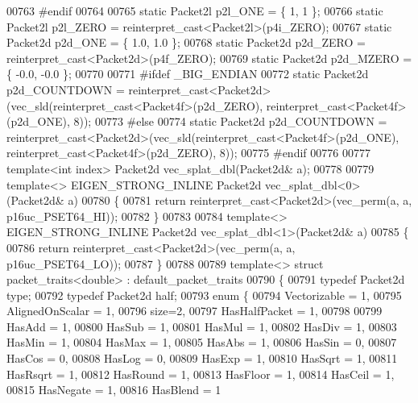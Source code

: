 \begin{DoxyCode}
{00763 \textcolor{preprocessor}{#endif}
00764 
00765 \textcolor{keyword}{static} Packet2l  p2l\_ONE  = \{ 1, 1 \};
00766 \textcolor{keyword}{static} Packet2l  p2l\_ZERO = \textcolor{keyword}{reinterpret\_cast<}Packet2l\textcolor{keyword}{>}(p4i\_ZERO);
00767 \textcolor{keyword}{static} Packet2d  p2d\_ONE  = \{ 1.0, 1.0 \}; 
00768 \textcolor{keyword}{static} Packet2d  p2d\_ZERO = \textcolor{keyword}{reinterpret\_cast<}Packet2d\textcolor{keyword}{>}(p4f\_ZERO);
00769 \textcolor{keyword}{static} Packet2d  p2d\_MZERO = \{ -0.0, -0.0 \};
00770 
00771 \textcolor{preprocessor}{#ifdef \_BIG\_ENDIAN}
00772 \textcolor{keyword}{static} Packet2d p2d\_COUNTDOWN = \textcolor{keyword}{reinterpret\_cast<}Packet2d\textcolor{keyword}{>}(vec\_sld(reinterpret\_cast<Packet4f>(p2d\_ZERO), 
      reinterpret\_cast<Packet4f>(p2d\_ONE), 8));
00773 \textcolor{preprocessor}{#else}
00774 \textcolor{keyword}{static} Packet2d p2d\_COUNTDOWN = \textcolor{keyword}{reinterpret\_cast<}Packet2d\textcolor{keyword}{>}(vec\_sld(reinterpret\_cast<Packet4f>(p2d\_ONE), 
      reinterpret\_cast<Packet4f>(p2d\_ZERO), 8));
00775 \textcolor{preprocessor}{#endif}
00776 
00777 \textcolor{keyword}{template}<\textcolor{keywordtype}{int} index> Packet2d vec\_splat\_dbl(Packet2d& a);
00778 
00779 \textcolor{keyword}{template}<> EIGEN\_STRONG\_INLINE Packet2d vec\_splat\_dbl<0>(Packet2d& a)
00780 \{
00781   \textcolor{keywordflow}{return} \textcolor{keyword}{reinterpret\_cast<}Packet2d\textcolor{keyword}{>}(vec\_perm(a, a, p16uc\_PSET64\_HI));
00782 \}
00783 
00784 \textcolor{keyword}{template}<> EIGEN\_STRONG\_INLINE Packet2d vec\_splat\_dbl<1>(Packet2d& a)
00785 \{
00786   \textcolor{keywordflow}{return} \textcolor{keyword}{reinterpret\_cast<}Packet2d\textcolor{keyword}{>}(vec\_perm(a, a, p16uc\_PSET64\_LO));
00787 \}
00788 
00789 \textcolor{keyword}{template}<> \textcolor{keyword}{struct }packet\_traits<double> : default\_packet\_traits
00790 \{
00791   \textcolor{keyword}{typedef} Packet2d type;
00792   \textcolor{keyword}{typedef} Packet2d half;
00793   \textcolor{keyword}{enum} \{
00794     Vectorizable = 1,
00795     AlignedOnScalar = 1,
00796     size=2,
00797     HasHalfPacket = 1,
00798 
00799     HasAdd  = 1,
00800     HasSub  = 1,
00801     HasMul  = 1,
00802     HasDiv  = 1,
00803     HasMin  = 1,
00804     HasMax  = 1,
00805     HasAbs  = 1,
00806     HasSin  = 0,
00807     HasCos  = 0,
00808     HasLog  = 0,
00809     HasExp  = 1,
00810     HasSqrt = 1,
00811     HasRsqrt = 1,
00812     HasRound = 1,
00813     HasFloor = 1,
00814     HasCeil = 1,
00815     HasNegate = 1,
00816     HasBlend = 1
}
\end{DoxyCode}
